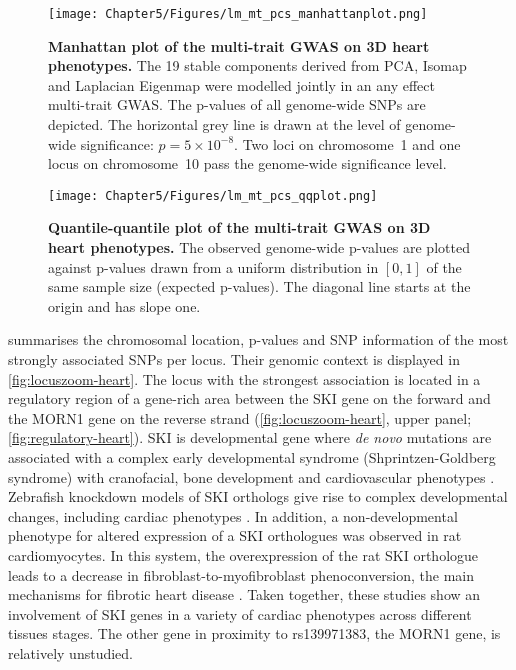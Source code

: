 \begin{figure}[hbtp]
	\centering
	\texttt{[image: Chapter5/Figures/lm\_mt\_pcs\_manhattanplot.png]}
	\caption[\textbf{Manhattan plot of the multi-trait GWAS on 3D heart phenotypes .}]{\textbf{Manhattan plot of the multi-trait GWAS on 3D heart phenotypes. }The \num{19} stable components derived from PCA, Isomap and Laplacian Eigenmap were modelled jointly in an any effect multi-trait GWAS. The p-values of all genome-wide SNPs are depicted. The horizontal grey line is drawn at the level of genome-wide significance: \(p = 5 \times 10^{-8}\). Two loci on chromosome~1 and one locus on chromosome~10 pass the genome-wide significance level.} 
	 	\label{fig:manhattan-heart}
\end{figure}
%
\begin{figure}[hbtp]
	\centering
	\texttt{[image: Chapter5/Figures/lm\_mt\_pcs\_qqplot.png]}
	\caption[\textbf{Quantile-quantile plot of the multi-trait GWAS on 3D heart phenotypes .}]{\textbf{Quantile-quantile plot of the multi-trait GWAS on 3D heart phenotypes. } The observed genome-wide p-values are plotted against p-values drawn from a uniform distribution in \([0,1]\) of the same sample size (expected p-values). The diagonal line starts at the origin and has slope one.} 
	 	\label{fig:qq-heart}
\end{figure}
%
 summarises the chromosomal location, p-values and SNP information of the most strongly associated SNPs per locus. Their genomic context is displayed in \cref{fig:locuszoom-heart}. The locus with the strongest association is located in a regulatory region of a gene-rich area between the SKI gene on the forward and the MORN1 gene on the reverse strand (\cref{fig:locuszoom-heart}, upper panel; \cref{fig:regulatory-heart}). SKI is developmental gene where \textit{de novo} mutations are associated with a complex early developmental syndrome (Shprintzen-Goldberg syndrome) with cranofacial, bone development and cardiovascular phenotypes \citep{Greally1993}. Zebrafish knockdown models of SKI orthologs give rise to complex developmental changes, including cardiac phenotypes \citep{Doyle2012}. In addition, a non-developmental phenotype for altered expression of a SKI orthologues was observed in rat cardiomyocytes. In this system, the overexpression of the rat SKI orthologue leads to a decrease in fibroblast-to-myofibroblast phenoconversion, the main mechanisms for fibrotic heart disease \citep{Cunnington2010,Cunnington2014,Zeglinski2016}. Taken together, these studies show an involvement of SKI genes in a variety of cardiac phenotypes across different tissues stages. The other gene in proximity to rs139971383, the MORN1 gene, is relatively unstudied. 

